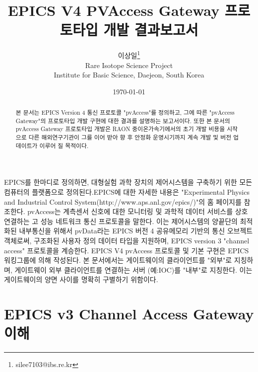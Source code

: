 \documentclass[11pt
  , a4paper
  , article
  , oneside
]{memoir}
\begin{document}
\newcommand{\technumber}{
  RAON Control-Document Series\\
  Revision : v1.0,   Release : 2016-12-02 fixed date}
\title{\textbf{EPICS V4 PVAccess Gateway 프로토타입 개발 결과보고서}}

\author{이상일\thanks{silee7103@ibs.re.kr} \\

  Rare Isotope Science Project\\
  Institute for Basic Science, Daejeon, South Korea
}
\date{\today}

\renewcommand{\maketitlehooka}{\begin{flushright}\textsf{\technumber}\end{flushright}}

\maketitle

\begin{abstract}
본 문서는 EPICS Version 4 통신 프로토콜 "pvAccess"를 정의하고, 그에 따른 "pvAccess Gateway"의 프로토타입 개발 구현에 대한 결과를 설명하는 보고서이다. 또한 본 문서의 pvAccess Gateway 프로토타입 개발은 RAON 중이온가속기에서의 초기 개발 비용을 시작으로 다른 해외연구기관이 그를 이어 받아 향 후 안정화 운영시기까지 계속 개발 및 버전 업데이트가 이루어 질 목적이다. 
\end{abstract}

EPICS를 한마디로 정의하면, 대형실험 과학 장치의 제어시스템을 구축하기 위한 모든 컴퓨터의 플랫폼으로 정의된다.EPICS에 대한 자세한 내용은 "Experimental Physics and Industrial Control System(http://www.aps.anl.gov/epics/)"의 홈 페이지를 참조한다. pvAccess는 계측센서 신호에 대한 모니터링 및 과학적 데이터 서비스를 상호 연결하는 고 성능 네트워크 통신 프로토콜을 말한다. 이는 제어시스템의 양끝단의 최적화된 내부통신을 위해서 pvData라는 EPICS 버전 4 공유메모리 기반의 통신 오브젝트 객체로써, 구조화된 사용자 정의 데이터 타입을 지원하며, EPICS version 3 "channel access" 프로토콜을 계승한다. EPICS V4 pvAccess 프로토콜 및 기본 구현은 EPICS 워킹그룹에 의해 작성된다.  본 문서에서는 게이트웨이의 클라이언트를 "외부"로 지칭하며, 게이트웨이 외부 클라이언트를  연결하는 서버 (예:IOC)를 "내부"로 지칭한다. 이는 게이트웨이의 양면 사이를 명확히 구별하기 위함이다.

\clearpage

\chapter{EPICS v3 Channel Access Gateway 이해}
\end{document}
